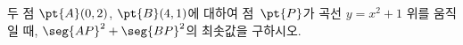 두 점 $\pt{A}(0{,}\mkern3mu\mathopen{}2)$, $\pt{B}(4{,}\mkern3mu\mathopen{}1)$에 대하여 점~$\pt{P}$가 곡선 $y=x^2+1$ 위를 움직일 때, $\seg{AP}^2+\seg{BP}^2$의 최솟값을 구하시오.

